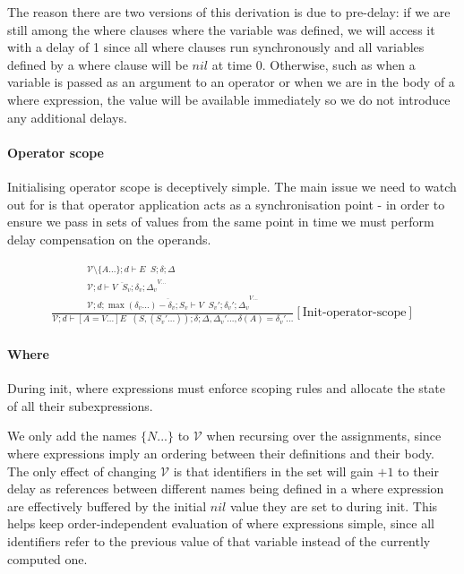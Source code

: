 \documentclass{scrartcl}
\DeclareMathOperator{\initrel}{\overset{init}{\Rightarrow}}
\DeclareMathOperator{\comprel}{\overset{compensate}{\Rightarrow}}
\begin{document}
    The reason there are two versions of this derivation is due to pre-delay: if we are still among the where clauses where the variable was defined, we will access it with a delay of 1 since all where clauses run synchronously and all variables defined by a where clause will be $nil$ at time 0. Otherwise, such as when a variable is passed as an argument to an operator or when we are in the body of a where expression, the value will be available immediately so we do not introduce any additional delays.
    
    \paragraph{Operator scope}
    
    Initialising operator scope is deceptively simple. The main issue we need to watch out for is that operator application acts as a synchronisation point - in order to ensure we pass in sets of values from the same point in time we must perform delay compensation on the operands.
    
    \begin{align*}
    \frac{
        \begin{matrix}
        \mathcal{V} \setminus \{A...\}; d \vdash E \initrel S; \delta; \Delta \\
        \overline{\mathcal{V}; d \vdash V \initrel S_v; \delta_v; \Delta_v}^{V...} \\
        \overline{\mathcal{V}; d; \max(\delta_v...) - \delta_v; S_v \vdash V \comprel S_v'; \delta_v'; \Delta_v}^{V...}
        \end{matrix}
    }{
        \mathcal{V}; d \vdash [A=V...]E \initrel (S, (S_v'...)); \delta; \Delta, \Delta_v'..., \delta(A)=\delta_v'...
    }[\text{Init-operator-scope}]
    \end{align*}
    
    \paragraph{Where}
    
    During init, where expressions must enforce scoping rules and allocate the state of all their subexpressions.
    
    We only add the names $\{N...\}$ to $\mathcal{V}$ when recursing over the assignments, since where expressions imply an ordering between their definitions and their body. The only effect of changing $\mathcal{V}$ is that identifiers in the set will gain $+1$ to their delay as references between different names being defined in a where expression are effectively buffered by the initial $nil$ value they are set to during init. This helps keep order-independent evaluation of where expressions simple, since all identifiers refer to the previous value of that variable instead of the currently computed one.
    
\end{document}
